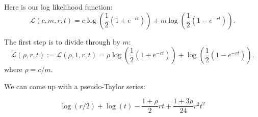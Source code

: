 \documentclass{amsart}
\newcommand{\llf}{\mathcal{L}}
\newcommand{\llfs}{\tilde{\llf}}
\begin{document}
Here is our log likelihood function:
\[
  \llf(c,m,r,t) = c \log\left(\frac{1}{2}(1+e^{-r t})\right) + m \log\left(\frac{1}{2}(1-e^{-r t})\right).
\]

The first step is to divide through by $m$:
\[
  \llfs(\rho,r,t) := \llf(\rho,1,r,t) = \rho \log \left(\frac{1}{2}(1+e^{-r t})\right) + \log \left(\frac{1}{2}(1-e^{-r t})\right).
\]
where $\rho = c/m$.

We can come up with a pseudo-Taylor series:

\[
  \log(r/2) + \log(t) - \frac{1+\rho}{2} r t + \frac{1+3 \rho}{24} r^2 t^2
\]

\end{document}
